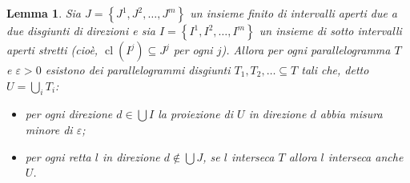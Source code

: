 \documentclass[a4paper, twoside,openright]{article}
\newcommand{\<}{\langle}
\renewcommand{\>}{\rangle}
\newtheorem{lemma}[teo]{Lemma}
\begin{document}
\begin{lemma} \label{altroarticolo}
	Sia $J=\left\{J^{1}, J^{2}, \ldots, J^{m}\right\}$ un insieme finito di intervalli aperti due a due disgiunti di direzioni e sia $I=\left\{I^{1}, I^{2}, \ldots, I^{m}\right\}$ un insieme di sotto intervalli aperti stretti (cioè, $\operatorname{cl}\left(I^{j}\right) \subseteq J^{j}$ per ogni $j$). Allora per ogni parallelogramma $T$ e $\varepsilon>0$ esistono dei parallelogrammi disgiunti $T_{1}, T_{2}, \ldots \subseteq T$ tali che, detto $U=\bigcup_iT_i$:
	
	\begin{itemize}
		\item per ogni direzione $d \in \bigcup I$ la proiezione di $U$ in direzione $d$ abbia misura minore di $\varepsilon$;
		\item per ogni retta $l$ in direzione $d \notin \bigcup J$, se $l$ interseca $T$ allora $l$ interseca anche $U$.	
	\end{itemize}
\end{lemma}	
\end{document}
